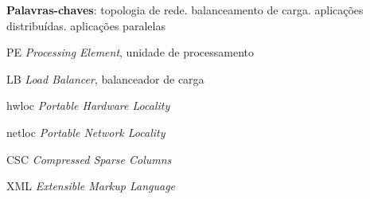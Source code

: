 \documentclass[
	12pt,				%
	openright,			%
	twoside,			%
	a4paper,			%
	english,			%
	brazil,				%
	]{abntex2}
\begin{document}
\begin{resumo}
 \vspace{\onelineskip}
    
 \noindent
 \textbf{Palavras-chaves}: topologia de rede. balanceamento de carga. aplicações distribuídas. aplicações paralelas
 
\end{resumo}
\cleardoublepage


 

\listoffigures*
\cleardoublepage


\listoftables*
\cleardoublepage


\listofalgorithms
\cleardoublepage

\begin{siglas}
  \item[PE] \textit{Processing Element}, unidade de processamento
  \item[LB] \textit{Load Balancer}, balanceador de carga
  \item[hwloc] \textit{Portable Hardware Locality}
  \item[netloc] \textit{Portable Network Locality}
  \item[CSC] \textit{Compressed Sparse Columns}
  \item[XML] \textit{Extensible Markup Language}
\end{siglas}
\end{document}
